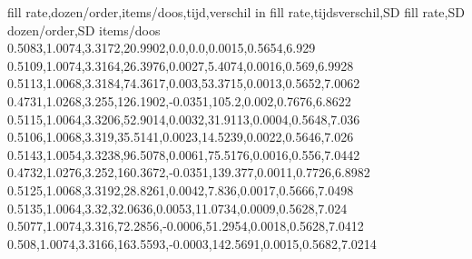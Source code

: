 fill rate,dozen/order,items/doos,tijd,verschil in fill rate,tijdsverschil,SD fill rate,SD dozen/order,SD items/doos
0.5083,1.0074,3.3172,20.9902,0.0,0.0,0.0015,0.5654,6.929
0.5109,1.0074,3.3164,26.3976,0.0027,5.4074,0.0016,0.569,6.9928
0.5113,1.0068,3.3184,74.3617,0.003,53.3715,0.0013,0.5652,7.0062
0.4731,1.0268,3.255,126.1902,-0.0351,105.2,0.002,0.7676,6.8622
0.5115,1.0064,3.3206,52.9014,0.0032,31.9113,0.0004,0.5648,7.036
0.5106,1.0068,3.319,35.5141,0.0023,14.5239,0.0022,0.5646,7.026
0.5143,1.0054,3.3238,96.5078,0.0061,75.5176,0.0016,0.556,7.0442
0.4732,1.0276,3.252,160.3672,-0.0351,139.377,0.0011,0.7726,6.8982
0.5125,1.0068,3.3192,28.8261,0.0042,7.836,0.0017,0.5666,7.0498
0.5135,1.0064,3.32,32.0636,0.0053,11.0734,0.0009,0.5628,7.024
0.5077,1.0074,3.316,72.2856,-0.0006,51.2954,0.0018,0.5628,7.0412
0.508,1.0074,3.3166,163.5593,-0.0003,142.5691,0.0015,0.5682,7.0214

